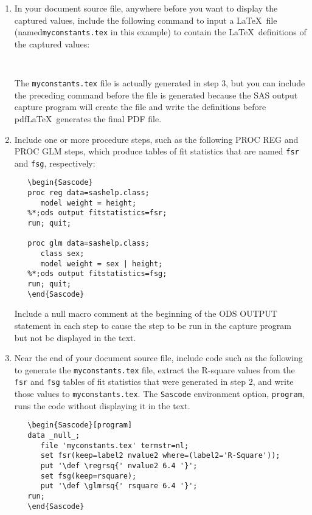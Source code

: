 \documentclass[article,oneside]{memoir}
\begin{document}
\begin{enumerate}
\item In your document source file, anywhere before you want to display the
      captured values, include the following command to
      input a \LaTeX\ file (named\newline\texttt{myconstants.tex} in this example)
      to contain the \LaTeX\ definitions of the captured values:
\begin{snugshade}
\begin{verbatim}
   
\end{verbatim}
\end{snugshade}

The \texttt{myconstants.tex} file is actually generated in step 3,
but you can include the preceding command before the file is generated
because the SAS output capture program will create the file and write
the definitions before pdf\LaTeX\ generates the final PDF file.

\item Include one or more procedure steps, such as the following
      PROC REG and PROC GLM steps, which produce tables of fit statistics
      that are named \texttt{fsr} and \texttt{fsg}, respectively:
\begin{snugshade}
\begin{verbatim}
   \begin{Sascode}
   proc reg data=sashelp.class;
      model weight = height;
   %*;ods output fitstatistics=fsr;
   run; quit;

   proc glm data=sashelp.class;
      class sex;
      model weight = sex | height;
   %*;ods output fitstatistics=fsg;
   run; quit;
   \end{Sascode}
\end{verbatim}
\end{snugshade}

Include a null macro comment at the beginning of the ODS OUTPUT statement
in each step to cause the step to be run in the capture program but not be
displayed in the text.

\item Near the end of your document source file, include code such as the
      following to generate the \texttt{myconstants.tex} file, extract the
      R-square values from the \texttt{fsr} and \texttt{fsg} tables of fit statistics that were
      generated in step 2, and write those values to \texttt{myconstants.tex}.
      The \texttt{Sascode} environment option, \texttt{program},
      runs the code without displaying it in the text.
\begin{snugshade}
\begin{verbatim}
   \begin{Sascode}[program]
   data _null_;
      file 'myconstants.tex' termstr=nl;
      set fsr(keep=label2 nvalue2 where=(label2='R-Square'));
      put '\def \regrsq{' nvalue2 6.4 '}';
      set fsg(keep=rsquare);
      put '\def \glmrsq{' rsquare 6.4 '}';
   run;
   \end{Sascode}
\end{verbatim}
\end{snugshade}


\end{enumerate}
\end{document}

